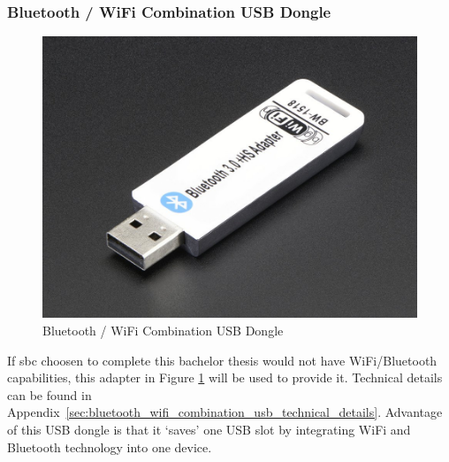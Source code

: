 \subsubsection{Bluetooth / WiFi Combination USB Dongle} %
\label{ssub:bluetooth_wifi_combination_usb_dongle}
\begin{figure}[H]
\begin{center}
\captionsetup{font=small}
\includegraphics[scale=0.2]{pics/dongle.jpg}
\caption{Bluetooth / WiFi Combination USB Dongle\cite{wifi_pic}}
\label{fig:wifi}
\end{center}
\end{figure}
If \gls{sbc} choosen to complete this bachelor thesis would not have WiFi/Bluetooth capabilities, this adapter in Figure \ref{fig:wifi} will be used to provide it. Technical details can be found in Appendix~\ref{sec:bluetooth_wifi_combination_usb_technical_details}. Advantage of this USB dongle is that it `saves' one USB slot by integrating WiFi and Bluetooth technology into one device.
